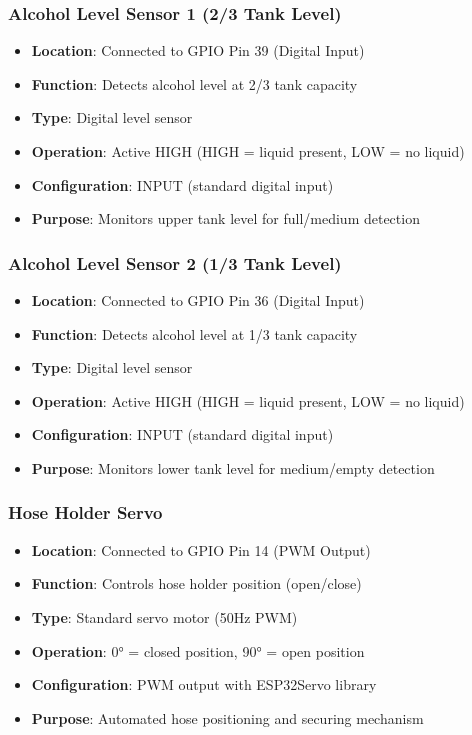 \documentclass[11pt,a4paper]{article}
\begin{document}
\subsubsection{Alcohol Level Sensor 1 (2/3 Tank Level)}
\begin{itemize}
    \item \textbf{Location}: Connected to GPIO Pin 39 (Digital Input)
    \item \textbf{Function}: Detects alcohol level at 2/3 tank capacity
    \item \textbf{Type}: Digital level sensor
    \item \textbf{Operation}: Active HIGH (HIGH = liquid present, LOW = no liquid)
    \item \textbf{Configuration}: INPUT (standard digital input)
    \item \textbf{Purpose}: Monitors upper tank level for full/medium detection
\end{itemize}

\subsubsection{Alcohol Level Sensor 2 (1/3 Tank Level)}
\begin{itemize}
    \item \textbf{Location}: Connected to GPIO Pin 36 (Digital Input)
    \item \textbf{Function}: Detects alcohol level at 1/3 tank capacity
    \item \textbf{Type}: Digital level sensor
    \item \textbf{Operation}: Active HIGH (HIGH = liquid present, LOW = no liquid)
    \item \textbf{Configuration}: INPUT (standard digital input)
    \item \textbf{Purpose}: Monitors lower tank level for medium/empty detection
\end{itemize}

\subsubsection{Hose Holder Servo}
\begin{itemize}
    \item \textbf{Location}: Connected to GPIO Pin 14 (PWM Output)
    \item \textbf{Function}: Controls hose holder position (open/close)
    \item \textbf{Type}: Standard servo motor (50Hz PWM)
    \item \textbf{Operation}: 0° = closed position, 90° = open position
    \item \textbf{Configuration}: PWM output with ESP32Servo library
    \item \textbf{Purpose}: Automated hose positioning and securing mechanism
\end{itemize}
\end{document}
